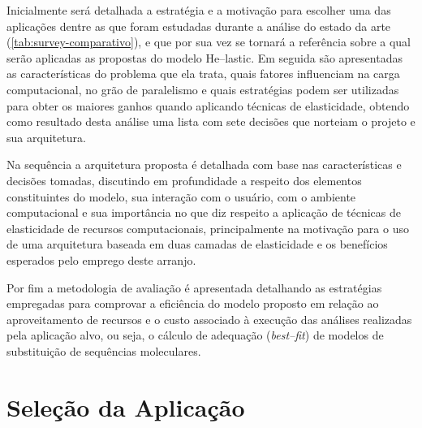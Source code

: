 \documentclass[english,brazilian]{UNISINOSmonografia} %
\begin{document}
Inicialmente será detalhada a estratégia e a motivação para escolher uma das aplicações dentre as que foram estudadas durante a análise do estado da arte (\autoref{tab:survey-comparativo}), e que por sua vez se tornará a referência sobre a qual serão aplicadas as propostas do modelo \textsf{He}--lastic.
Em seguida são apresentadas as características do problema que ela trata, quais fatores influenciam na carga computacional, no grão de paralelismo e quais estratégias podem ser utilizadas para obter os maiores ganhos quando aplicando técnicas de elasticidade, obtendo como resultado desta análise uma lista com sete decisões que norteiam o projeto e sua arquitetura.


Na sequência a arquitetura proposta é detalhada com base nas características e decisões tomadas, discutindo em profundidade a respeito dos elementos constituintes do modelo, sua interação com o usuário, com o ambiente computacional e sua importância no que diz respeito a aplicação de técnicas de elasticidade de recursos computacionais, principalmente na motivação para o uso de uma arquitetura baseada em duas camadas de elasticidade e os benefícios esperados pelo emprego deste arranjo.



Por fim a metodologia de avaliação é apresentada detalhando as estratégias empregadas para comprovar a eficiência do modelo proposto em relação ao aproveitamento de recursos e o custo associado à execução das análises realizadas pela aplicação alvo, ou seja, o cálculo de adequação (\textit{best--fit}) de modelos de substituição de sequências moleculares.





\section{Seleção da Aplicação} %
\label{sec:modelo-selecao}
\end{document}
